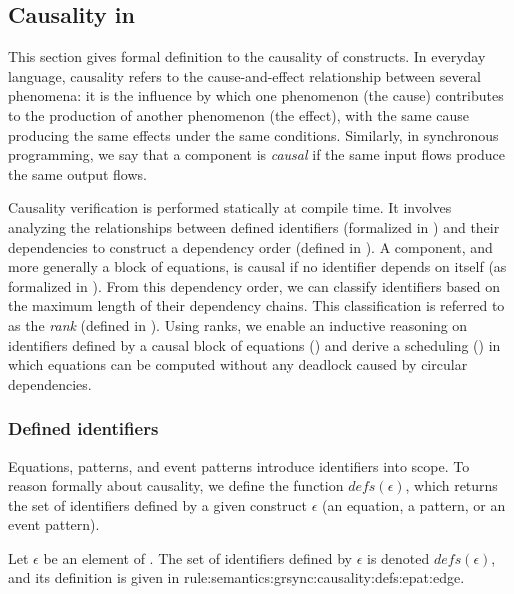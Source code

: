 \subsection{Causality in \GRSync}
\label{sec:semantics:grsync:causality}

This section gives formal definition to the causality of \GRSync constructs.
%
In everyday language, causality refers to the cause-and-effect relationship between several
phenomena: it is the influence by which one phenomenon (the cause) contributes to the production of
another phenomenon (the effect), with the same cause producing the same effects under the same
conditions.
%
Similarly, in synchronous programming, we say that a component is \emph{causal} if the same input
flows produce the same output flows.

Causality verification is performed statically at compile time. It involves analyzing the
relationships between defined identifiers (formalized in ) and their
dependencies to construct a dependency order (defined in ).
A component, and more generally a block of equations, is causal if no identifier depends on itself
(as formalized in ).
%
From this dependency order, we can classify identifiers based on the maximum length of their
dependency chains. This classification is referred to as the \emph{rank}
(defined in ). Using ranks, we enable an inductive
reasoning on identifiers defined by a causal block of equations ()
and derive a scheduling () in which equations can
be computed without any deadlock caused by circular dependencies.

\subsubsection{Defined identifiers}
\label{sec:semantics:grsync:causality:defs}

\newcommand{\defs}[1]{{\ensuremath{\textit{defs}\left(#1\right)}}}

Equations, patterns, and event patterns introduce identifiers into scope. To reason formally about
causality, we define the function $\defs{\epsilon}$, which returns the set of identifiers defined
by a given \GRSync construct $\epsilon$ (an equation, a pattern, or an event pattern).

\begin{definition}
    Let $\epsilon$ be an element of \GRSync. The set of identifiers defined by $\epsilon$ is
    denoted \defs{\epsilon}, and its definition is given in
    {rule:semantics:grsync:causality:defs:epat:edge}.
\end{definition}

